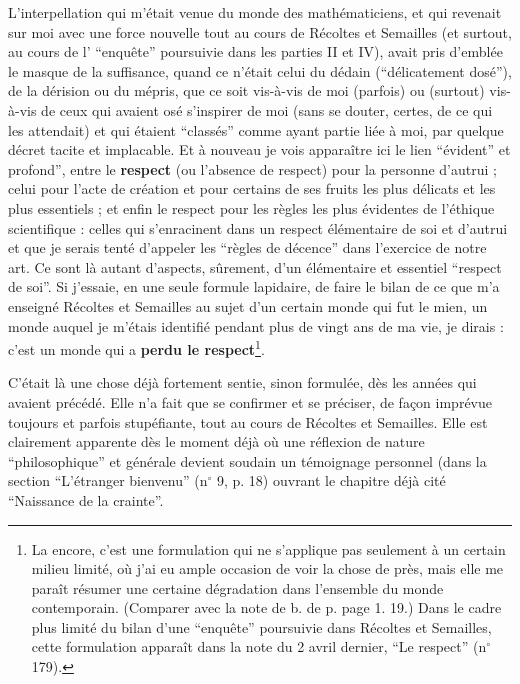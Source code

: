 L'interpellation qui m'était venue du monde des mathématiciens, et qui revenait sur moi avec une force nouvelle tout au cours de Récoltes et Semailles (et surtout, au cours de l' ``enquête'' poursuivie dans les parties II et IV), avait pris d'emblée le masque de la suffisance, quand ce n'était celui du dédain (``délicatement dosé''), de la dérision ou du mépris, que ce soit vis-à-vis de moi (parfois) ou (surtout) vis-à-vis de ceux qui avaient osé s'inspirer de moi (sans se douter, certes, de ce qui les attendait) et qui étaient ``classés'' comme ayant partie liée à moi, par quelque décret tacite et implacable. Et à nouveau je vois apparaître ici le lien ``évident'' et profond'', entre le \textbf{respect} (ou l'absence de respect) pour la personne d'autrui ; celui pour l'acte de création et pour certains de ses fruits les plus délicats et les plus essentiels ; et enfin le respect pour les règles les plus évidentes de l'éthique scientifique : celles qui s'enracinent dans un respect élémentaire de soi et d'autrui et que je serais tenté d'appeler les ``règles de décence'' dans l'exercice de notre art. Ce sont là autant d'aspects, sûrement, d'un élémentaire et essentiel ``respect de soi''. Si j'essaie, en une seule formule lapidaire, de faire le bilan de ce que m'a enseigné Récoltes et Semailles au sujet d'un certain monde qui fut le mien, un monde auquel je m'étais identifié pendant plus de vingt ans de ma vie, je dirais : c'est un monde qui a \textbf{perdu le respect}\footnote{La encore, c'est une formulation qui ne s'applique pas seulement à un certain milieu limité, où j'ai eu ample occasion de voir la chose de près, mais elle me paraît résumer une certaine dégradation dans l'ensemble du monde contemporain. (Comparer avec la note de b. de p. page 1. 19.) Dans le cadre plus limité du bilan d'une ``enquête'' poursuivie dans Récoltes et Semailles, cette formulation apparaît dans la note du 2 avril dernier, ``Le respect'' (n$^{\circ}$ 179).}.

C'était là une chose déjà fortement sentie, sinon formulée, dès les années qui avaient précédé. Elle n'a fait que se confirmer et se préciser, de façon imprévue toujours et parfois stupéfiante, tout au cours de Récoltes et Semailles. Elle est clairement apparente dès le moment déjà où une réflexion de nature ``philosophique'' et générale devient soudain un témoignage personnel (dans la section ``L'étranger bienvenu'' (n$^{\circ}$ 9, p. 18) ouvrant le chapitre déjà cité ``Naissance de la crainte''.

